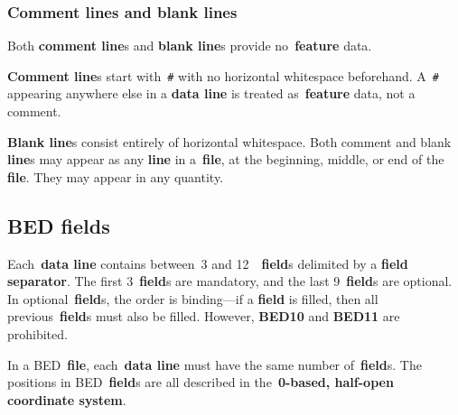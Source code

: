 \documentclass[11pt]{article}
\begin{document}
\subsubsection{Comment lines and blank lines}

Both \textbf{comment line}s and \textbf{blank line}s provide no~\textbf{feature} data.

\textbf{Comment line}s start with~\texttt{\#} with no horizontal whitespace beforehand.
A~\texttt{\#} appearing anywhere else in a \textbf{data line} is treated as~\textbf{feature} data, not a comment.

\textbf{Blank line}s consist entirely of horizontal whitespace.
Both comment and blank \textbf{line}s may appear as any \textbf{line} in a~\textbf{file}, at the beginning, middle, or end of the \textbf{file}.
They may appear in any quantity.

\subsection{\acs{BED} fields}

Each~\textbf{data line} contains between~3 and 12~~\textbf{field}s delimited by a \textbf{field separator}.
The first 3~\textbf{field}s are mandatory, and the last 9~\textbf{field}s are optional.
In optional~\textbf{field}s, the order is binding---if a \textbf{field} is filled, then all previous~\textbf{field}s must also be filled.
However, \textbf{BED10} and \textbf{BED11} are prohibited.

In a \ac{BED}~\textbf{file}, each~\textbf{data line} must have the same number of~\textbf{field}s.
The positions in \ac{BED}~\textbf{field}s are all described in the~\textbf{0-based, half-open coordinate system}.
\end{document}
